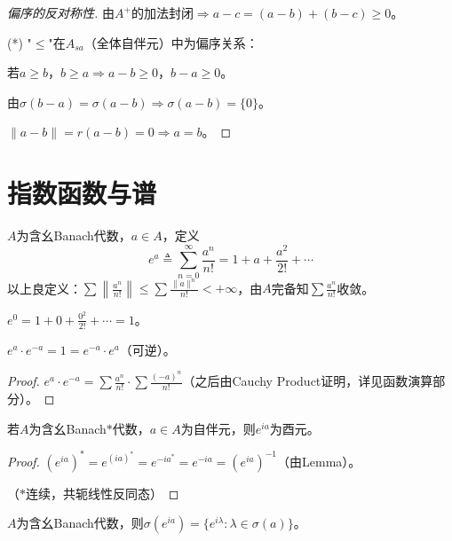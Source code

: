 \documentclass[lang=cn,a4paper,newtx,section]{elegantbook}
\begin{document}
\begin{proof}[偏序的反对称性]
  由$A^+$的加法封闭$\Rightarrow a - c = (a - b) + (b - c) \geq 0$。
  
  (*) "$\leq$"在$A_{sa}$（全体自伴元）中为偏序关系：
  
  若$a \geq b$，$b \geq a \Rightarrow a - b \geq 0$，$b - a \geq 0$。
  
  由$\sigma(b - a) = \sigma(a - b) \Rightarrow \sigma(a - b) = \{0\}$。
  
  $\|a - b\| = r(a - b) = 0 \Rightarrow a = b$。
\end{proof}

\section{指数函数与谱}

\begin{definition}[指数函数]
  $A$为含幺Banach代数，$a \in A$，定义
  \begin{equation*}
    e^a \triangleq \sum_{n=0}^\infty \frac{a^n}{n!} = 1 + a + \frac{a^2}{2!} + \cdots
  \end{equation*}
  以上良定义：$\sum\left\|\frac{a^n}{n!}\right\| \leq \sum\frac{\|a\|^n}{n!} < +\infty$，由$A$完备知$\sum\frac{a^n}{n!}$收敛。
\end{definition}

\begin{remark}
  $e^0 = 1 + 0 + \frac{0^2}{2!} + \cdots = 1$。
\end{remark}

\begin{lemma}
  $e^a \cdot e^{-a} = 1 = e^{-a} \cdot e^a$（可逆）。
\end{lemma}

\begin{proof}
  $e^a \cdot e^{-a} = \sum\frac{a^n}{n!} \cdot \sum\frac{(-a)^n}{n!}$（之后由Cauchy Product证明，详见函数演算部分）。
\end{proof}

\begin{corollary}
  若$A$为含幺Banach$*$代数，$a \in A$为自伴元，则$e^{ia}$为酉元。
\end{corollary}

\begin{proof}
  $(e^{ia})^* = e^{(ia)^*} = e^{-ia^*} = e^{-ia} = (e^{ia})^{-1}$（由Lemma）。
  
  （$*$连续，共轭线性反同态）
\end{proof}

\begin{proposition}
  $A$为含幺Banach代数，则$\sigma(e^{ia}) = \{e^{i\lambda} : \lambda \in \sigma(a)\}$。
\end{proposition}
\end{document}
